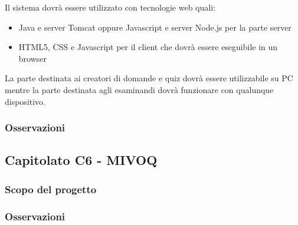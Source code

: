 Il sistema dovrà essere utilizzato con tecnologie web quali:
\begin{itemize}
	\item Java e server Tomcat oppure Javascript e server Node.js per la parte server
	\item HTML5, CSS e Javascript per il client che dovrà essere eseguibile in un browser
\end{itemize}
La parte destinata ai creatori di domande e quiz dovrà essere utilizzabile su PC mentre la parte destinata agli esaminandi
dovrà funzionare con qualunque dispositivo.

\subsubsection{Osservazioni}

\subsection{Capitolato C6 - MIVOQ}
\subsubsection{Scopo del progetto}

\subsubsection{Osservazioni}

